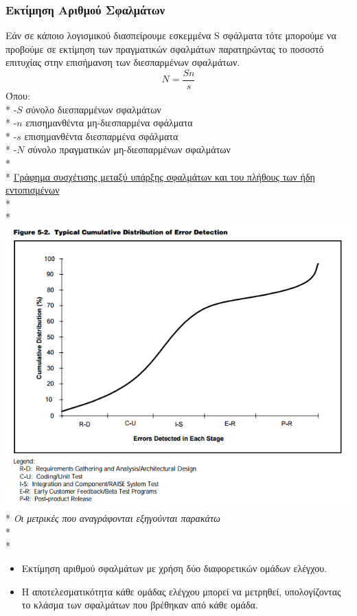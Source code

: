 \documentclass[a4paper, 11pt]{article}
\begin{document}
{{\subsubsection{Εκτίμηση Αριθμού Σφαλμάτων}
Εάν σε κάποιο λογισμικού διασπείρουμε εσκεμμένα S σφάλματα τότε μπορούμε να προβούμε σε εκτίμηση των πραγματικών σφαλμάτων παρατηρώντας το ποσοστό επιτυχίας στην επισήμανση των διεσπαρμένων σφαλμάτων.
\[Ν = \frac{Sn}{s}\]
Όπου:\\*
-\(S\)  σύνολο διεσπαρμένων σφαλμάτων\\*
-\(n\)  επισημανθέντα μη-διεσπαρμένα σφάλματα\\*
-\(s\)  επισημανθέντα διεσπαρμένα σφάλματα\\*
-\(N\) σύνολο πραγματικών μη-διεσπαρμένων σφαλμάτων\\*
\\*
\underline{Γράφημα συσχέτισης μεταξύ υπάρξης σφαλμάτων και του πλήθους των ήδη εντοπισμένων}\\*
\\*
\includegraphics[width = 15cm, height = 12 cm]{images/errorGraph.png}\\*
\textit{Οι μετρικές που αναγράφονται εξηγούνται παρακάτω}\\*
\\*
\begin{itemize}
\item Εκτίμηση αριθμού σφαλμάτων με χρήση δύο διαφορετικών ομάδων ελέγχου.
\item Η αποτελεσματικότητα κάθε ομάδας ελέγχου μπορεί να μετρηθεί, υπολογίζοντας το κλάσμα των σφαλμάτων που βρέθηκαν από κάθε ομάδα.

\end{itemize}}}
\end{document}
